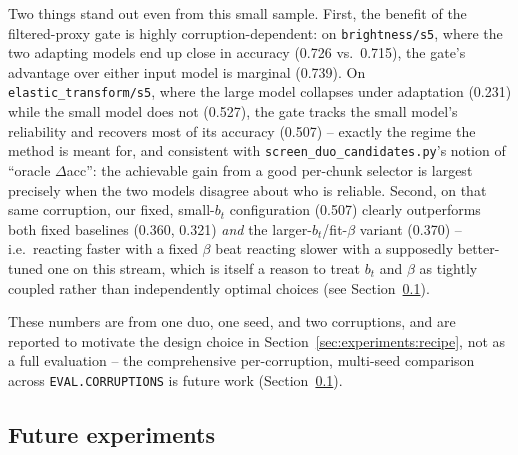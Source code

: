 Two things stand out even from this small sample. First, the benefit of the
filtered-proxy gate is highly corruption-dependent: on
\texttt{brightness/s5}, where the two adapting models end up close in
accuracy (0.726 vs.\ 0.715), the gate's advantage over either input model is
marginal (0.739). On \texttt{elastic\_transform/s5}, where the large model
collapses under adaptation (0.231) while the small model does not
(0.527), the gate tracks the small model's reliability and recovers most of
its accuracy (0.507) -- exactly the regime the method is meant for, and
consistent with \texttt{screen\_duo\_candidates.py}'s notion of ``oracle
$\Delta$acc'': the achievable gain from a good per-chunk selector is largest
precisely when the two models disagree about who is reliable. Second, on
that same corruption, our fixed, small-$b_t$ configuration
(0.507) clearly outperforms both fixed baselines (0.360, 0.321) \emph{and}
the larger-$b_t$/fit-$\beta$ variant (0.370) -- i.e.\ reacting faster with a
fixed $\beta$ beat reacting slower with a supposedly better-tuned one on
this stream, which is itself a reason to treat $b_t$ and $\beta$ as tightly
coupled rather than independently optimal choices (see
Section~\ref{sec:experiments:future}).

These numbers are from one duo, one seed, and two corruptions, and are
reported to motivate the design choice in
Section~\ref{sec:experiments:recipe}, not as a full evaluation -- the
comprehensive per-corruption, multi-seed comparison across
\texttt{EVAL.CORRUPTIONS} is future work (Section~\ref{sec:experiments:future}).

\subsection{Future experiments}
\label{sec:experiments:future}


